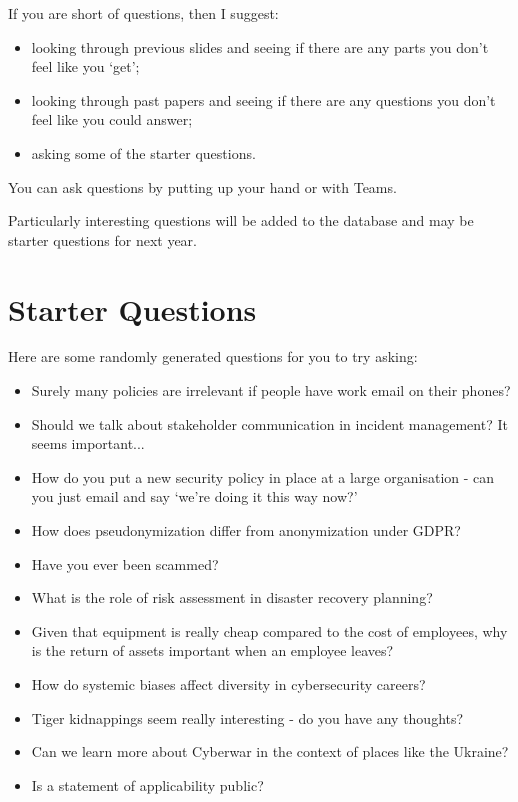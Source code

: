 \documentclass[12pt]{article}
\begin{document}
If you are short of questions, then I suggest: 

\begin{itemize} 
\item looking through previous slides and seeing if there are any parts you don't feel like you `get';
\item looking through past papers and seeing if there are any questions you don't feel like you could answer;
\item asking some of the starter questions.
\end{itemize} 

You can ask questions by putting up your hand or with Teams.  

Particularly interesting questions will be added to the database and may be starter questions for next year.  

\section*{Starter Questions} 
Here are some randomly generated questions for you to try asking: 

\begin{itemize}
  \item Surely many policies are irrelevant if people have work email on their phones?
  \item Should we talk about stakeholder communication in incident management? It seems important...
  \item How do you put a new security policy in place at a large organisation - can you just email and say `we're doing it this way now?'
  \item How does pseudonymization differ from anonymization under GDPR?
  \item Have you ever been scammed?
  \item What is the role of risk assessment in disaster recovery planning?
  \item Given that equipment is really cheap compared to the cost of employees, why is the return of assets important when an employee leaves?
  \item How do systemic biases affect diversity in cybersecurity careers?
  \item Tiger kidnappings seem really interesting - do you have any thoughts?
  \item Can we learn more about Cyberwar in the context of places like the Ukraine?
  \item Is a statement of applicability public?
\end{itemize}
\end{document}

